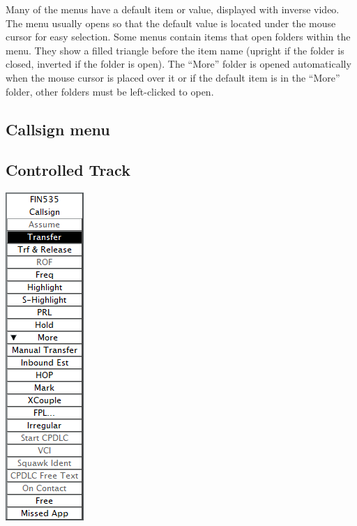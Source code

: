 \documentclass[11pt,a4paper,oldfontcommands]{memoir}
\begin{document}
Many of the menus have a default item or value, displayed with inverse video. The menu usually opens so
that the default value is located under the mouse cursor for easy selection. Some menus contain items that
open folders within the menu. They show a filled triangle before the item name (upright if the folder is
closed, inverted if the folder is open). The “More” folder is opened automatically when the mouse cursor is
placed over it or if the default item is in the “More” folder, other folders must be left-clicked to open.\\

\subsection{Callsign menu}
\label{menu:cs}
\subsection{Controlled Track}
\includegraphics{img/cm.png}
\end{document}
